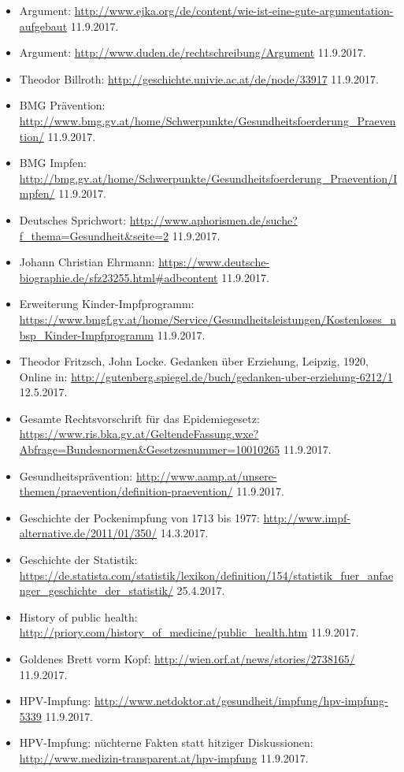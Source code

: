 \documentclass[
    a4paper,
    12pt,
    hyphens,
    chapterprefix=true,
    headheight=33pt,
    footheight=29pt,
    headings=optiontohead, %
]{scrartcl}
\begin{document}
{\begin{itemize}
\item{Argument: \url{http://www.ejka.org/de/content/wie-ist-eine-gute-argumentation-aufgebaut} 11.9.2017.}
\item{Argument: \url{http://www.duden.de/rechtschreibung/Argument} 11.9.2017.}
\item{Theodor Billroth: \url{http://geschichte.univie.ac.at/de/node/33917} 11.9.2017.}
\item{BMG Prävention: \url{http://www.bmg.gv.at/home/Schwerpunkte/Gesundheitsfoerderung_Praevention/} 11.9.2017.}
\item{BMG Impfen: \url{http://bmg.gv.at/home/Schwerpunkte/Gesundheitsfoerderung_Praevention/Impfen/} 11.9.2017.}
\item{Deutsches Sprichwort: \url{http://www.aphorismen.de/suche?f_thema=Gesundheit&seite=2} 11.9.2017.}
\item{Johann Christian Ehrmann: \url{https://www.deutsche-biographie.de/sfz23255.html#adbcontent} 11.9.2017.}
\item{Erweiterung Kinder-Impfprogramm: \url{https://www.bmgf.gv.at/home/Service/Gesundheitsleistungen/Kostenloses_nbsp_Kinder-Impfprogramm} 11.9.2017.}
\item{Theodor Fritzsch, John Locke. Gedanken über Erziehung, Leipzig, 1920, Online in: \url{http://gutenberg.spiegel.de/buch/gedanken-uber-erziehung-6212/1} 12.5.2017.}
\item{Gesamte Rechtsvorschrift für das Epidemiegesetz: \url{https://www.ris.bka.gv.at/GeltendeFassung.wxe?Abfrage=Bundesnormen&Gesetzesnummer=10010265} 11.9.2017.}
\item{Gesundheitsprävention: \url{http://www.aamp.at/unsere-themen/praevention/definition-praevention/} 11.9.2017.}
\item{Geschichte der Pockenimpfung von 1713 bis 1977: \url{http://www.impf-alternative.de/2011/01/350/} 14.3.2017.}
\item{Geschichte der Statistik: \url{https://de.statista.com/statistik/lexikon/definition/154/statistik_fuer_anfaenger_geschichte_der_statistik/} 25.4.2017.}
\item{History of public health: \url{http://priory.com/history_of_medicine/public_health.htm} 11.9.2017.}
\item{Goldenes Brett vorm Kopf: \url{http://wien.orf.at/news/stories/2738165/} 11.9.2017.}
\item{HPV-Impfung: \url{http://www.netdoktor.at/gesundheit/impfung/hpv-impfung-5339} 11.9.2017.}
\item{HPV-Impfung: nüchterne Fakten statt hitziger Diskussionen: \url{http://www.medizin-transparent.at/hpv-impfung} 11.9.2017.}

\end{itemize}}
\end{document}

